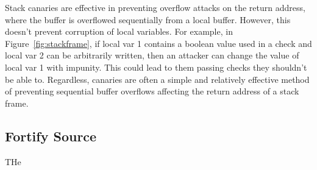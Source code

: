 Stack canaries are effective in preventing overflow attacks on the return address, where the buffer is overflowed sequentially from a local buffer. 
However, this doesn't prevent corruption of local variables. 
For example, in Figure~\ref{fig:stackframe}, if local var 1 contains a boolean value used in a check and local var 2 can be arbitrarily written, then an attacker can change the value of local var 1 with impunity. 
This could lead to them passing checks they shouldn't be able to. 
Regardless, canaries are often a simple and relatively effective method of preventing sequential buffer overflows affecting the return address of a stack frame. 

\subsection{Fortify Source}

THe 
